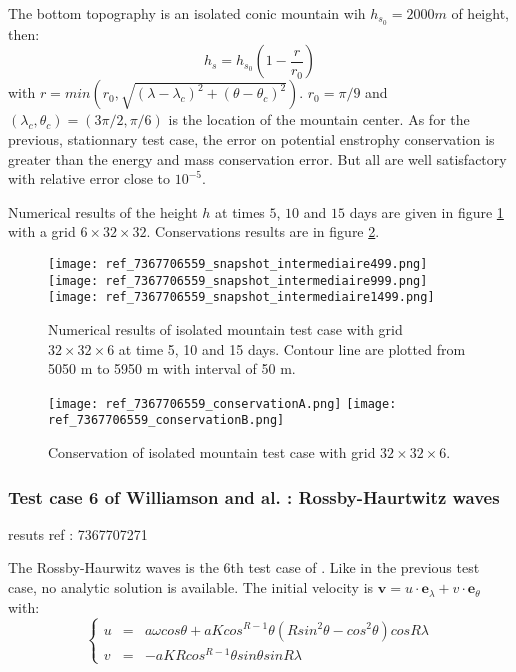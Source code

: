 The bottom topography is an isolated conic mountain wih $h_{s_0}=2000m$ of height, then:
\begin{equation}
h_s = h_{s_0} \left( 1 - \dfrac{r}{r_0} \right)
\end{equation}
with $r=min \left( r_0, \sqrt{\left( \lambda - \lambda_c \right)^2 + \left( \theta - \theta_c \right)^2} \right)$. $r_0=\pi/9$ and $(\lambda_c, \theta_c)=(3 \pi /2, \pi /6)$ is the location of the mountain center. As for the previous, stationnary test case, the error on potential enstrophy conservation is greater than the energy and mass conservation error. But all are well satisfactory with relative error close to $10^{-5}$. 

Numerical results of the height $h$ at times $5$, $10$ and $15$ days are given in figure \ref{fig:W5 snapshot} with a grid $6 \times 32 \times 32$. Conservations results are in figure \ref{fig:W5 conservation}.

\begin{figure}[ht!]
\texttt{[image: ref\_7367706559\_snapshot\_intermediaire499.png]}\\
\texttt{[image: ref\_7367706559\_snapshot\_intermediaire999.png]}\\
\texttt{[image: ref\_7367706559\_snapshot\_intermediaire1499.png]}
\caption{Numerical results of isolated mountain test case with grid  $32 \times 32 \times 6$ at time 5, 10 and 15 days. Contour line are plotted from 5050 m to 5950 m with interval of 50 m.}
\label{fig:W5 snapshot}
\end{figure}

\begin{figure}[ht!]
\texttt{[image: ref\_7367706559\_conservationA.png]}
\texttt{[image: ref\_7367706559\_conservationB.png]}
\caption{Conservation of isolated mountain test case with grid  $32 \times 32 \times 6$.}
\label{fig:W5 conservation}
\end{figure}

\subsubsection{Test case 6 of Williamson and al. : Rossby-Haurtwitz waves}

resuts ref : 7367707271

The Rossby-Haurwitz waves is the 6th test case of \cite{Williamson-Drake-Hack-Jakob-Swarztrauber}. Like in the previous test case, no analytic solution is available.
The initial velocity is $\mathbf{v}=u \cdot \mathbf{e}_{\lambda}+v \cdot \mathbf{e}_{\theta}$ with:
\begin{equation}
\left\lbrace
\begin{array}{rcl}
u & = & a \omega cos \theta + a K cos^{R-1} \theta \left( R sin^2 \theta - cos^2 \theta \right) cos R\lambda\\
v & = & -a K R cos^{R-1} \theta sin \theta sin R \lambda
\end{array}
\label{eq:W6 velocity}
\right.
\end{equation} 

